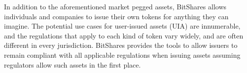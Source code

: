 \label{sec:uia}

In addition to the aforementioned market pegged assets, BitShares allows
individuals and companies to issue their own tokens for anything they can
imagine. The potential use cases for user-issued assets (UIA) are innumerable,
and the regulations that apply to each kind of token vary widely, and are often
different in every jurisdiction. BitShares provides the tools to allow issuers
to remain compliant with all applicable regulations when issuing assets
assuming regulators allow such assets in the first place.
